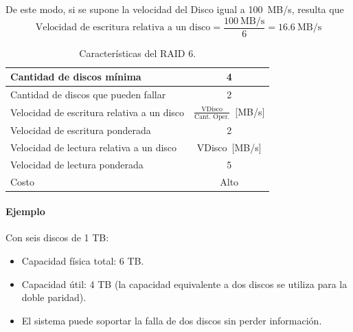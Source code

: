De este modo, si se supone la velocidad del Disco igual a 100~MB/s, resulta que 
\[
  \text{Velocidad de escritura relativa a un disco} = \frac{100~\text{MB/s}}{6} = 16.6~\text{MB/s}
\]

\begin{table}[!ht]
  \centering
  \begin{tabular}{l|c}
    Cantidad de discos mínima & 4 \\\hline
    Cantidad de discos que pueden fallar & 2 \\ \hline
    Velocidad de escritura relativa a un disco & \(\frac{\text{VDisco}}{\text{Cant. Oper.}}\)~[MB/s] \\\hline
    Velocidad de escritura ponderada & 2 \\ \hline
    Velocidad de lectura relativa a un disco & VDisco~[MB/s] \\ \hline
    Velocidad de lectura ponderada & 5 \\ \hline
    Costo & Alto
  \end{tabular}
  \caption{Características del RAID 6.}
\end{table}

\paragraph{Ejemplo}
Con seis discos de 1 TB:
\begin{itemize}
  \item Capacidad física total: 6 TB.
  \item Capacidad útil: 4 TB (la capacidad equivalente a dos discos se utiliza para la doble paridad).
  \item El sistema puede soportar la falla de dos discos sin perder información.
\end{itemize}
